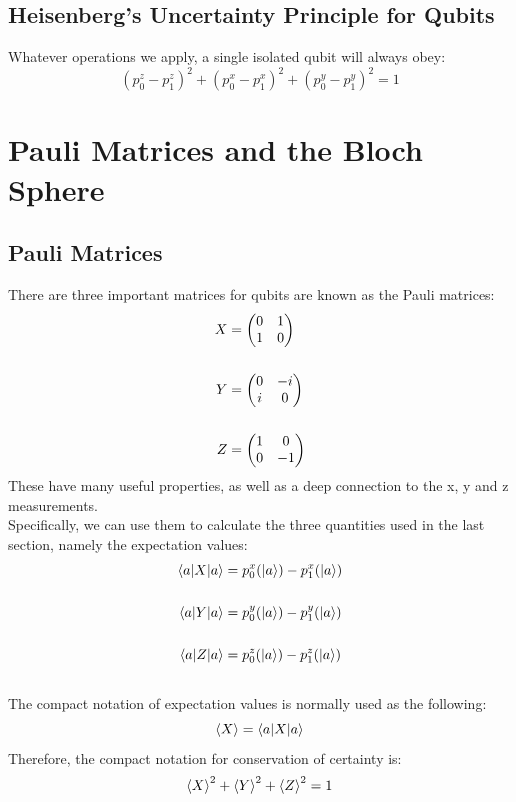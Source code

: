 \documentclass[hidelinks, a4paper, 12pt]{article}
\newcommand{\n}{\\[\baselineskip]}
\begin{document}
        \subsection{Heisenberg's Uncertainty Principle for Qubits}
            Whatever operations we apply, a single isolated qubit will always obey:
            \[(p_0^z - p_1^z)^2 + (p_0^x - p_1^x)^2 + (p_0^y - p_1^y)^2 = 1\]

    \section{Pauli Matrices and the Bloch Sphere}
        \subsection{Pauli Matrices}
            There are three important matrices for qubits are known as the Pauli matrices:
            \[\begin{split}
                X &= \begin{pmatrix} 0 & 1 \\ 1 & 0 \end{pmatrix}\n
                Y &= \begin{pmatrix} 0 & -i \\ i & 0 \end{pmatrix}\n
                Z &= \begin{pmatrix} 1 & 0 \\ 0 & -1 \end{pmatrix}
            \end{split}\]
            These have many useful properties, as well as a deep connection to the x, y and z measurements.\n
            Specifically, we can use them to calculate the three quantities used in the last section, namely the expectation values:
            \[\begin{split}
                \braket{a|X|a} &= p_0^x(\ket{a}) - p_1^x(\ket{a})\n
                \braket{a|Y|a} &= p_0^y(\ket{a}) - p_1^y(\ket{a})\n
                \braket{a|Z|a} &= p_0^z(\ket{a}) - p_1^z(\ket{a})\n
            \end{split}\]
            The compact notation of expectation values is normally used as the following:
            \[\braket{X} = \braket{a|X|a}\]
            Therefore, the compact notation for conservation of certainty is:
            \[\braket{X}^2 + \braket{Y}^2 + \braket{Z}^2 = 1\]
\end{document}

